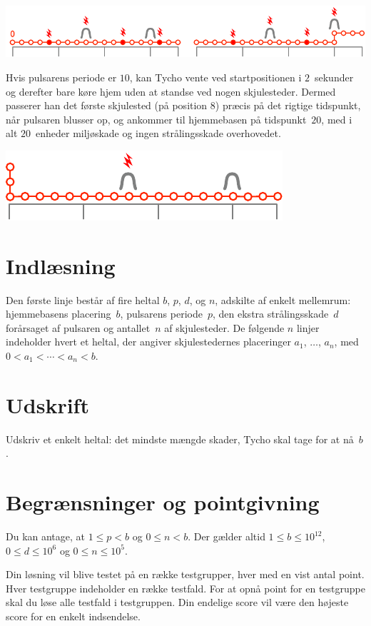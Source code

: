\includegraphics[width=.8\textwidth]{img/sample1_2.pdf}

Hvis pulsarens periode er $10$, kan Tycho vente ved startpositionen i $2$~sekunder og derefter bare køre hjem uden at standse ved nogen skjulesteder.
Dermed passerer han det første skjulested (på position $8$) præcis på det rigtige tidspunkt, når pulsaren blusser op, og ankommer til hjemmebasen på tidspunkt~$20$, med i alt $20$~enheder miljøskade og ingen strålingsskade overhovedet.

\includegraphics[width=.4\textwidth]{img/sample3.pdf}

\section*{Indlæsning}

Den første linje består af fire heltal $b$, $p$, $d$, og $n$, adskilte af enkelt mellemrum:
hjemmebasens placering~$b$,
pulsarens periode~$p$,
den ekstra strålingsskade~$d$ forårsaget af pulsaren og
antallet~$n$ af skjulesteder.
De følgende $n$ linjer indeholder hvert et heltal, der angiver skjulestedernes placeringer $a_1$, $\ldots$, $a_n$, med
$0<a_1<\cdots <a_n< b$. %

\section*{Udskrift}

Udskriv et enkelt heltal: det mindste mængde skader, Tycho skal tage for at nå~$b$.

\section*{Begrænsninger og pointgivning}

Du kan antage, at
$1 \leq p < b$ %
og
$0 \leq n < b$. %
Der gælder altid
$1\leq b\leq 10^{12}$, %
$0\leq d \leq 10^6$ %
og
$0\leq n \leq 10^5$. %

Din løsning vil blive testet på en række testgrupper, hver med en vist antal point.
Hver testgruppe indeholder en række testfald.
For at opnå point for en testgruppe skal du løse alle testfald i testgruppen.
Din endelige score vil være den højeste score for en enkelt indsendelse.

